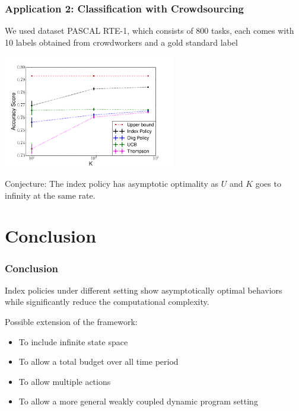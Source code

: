 \documentclass{beamer}
\begin{document}
\begin{frame}[plain]
\frametitle{Application 2: Classification with Crowdsourcing}
We used dataset PASCAL RTE-1\cite{Snow2008}, which consists of 800 tasks, each comes with 10 labels obtained from crowdworkers and a gold standard label\\

\begin{center}
\includegraphics[width=75mm]{plot_real_sim_reward.pdf}
\end{center}

Conjecture: The index policy has asymptotic optimality as $U$ and $K$ goes to infinity at the same rate.
\end{frame}

\section{Conclusion}
\begin{frame}[plain]
\frametitle{Conclusion}
Index policies under different setting show asymptotically optimal behaviors while significantly reduce the computational complexity.

Possible extension of the framework:
\begin{itemize}
\item To include infinite state space
\item To allow a total budget over all time period
\item To allow multiple actions
\item To allow a more general weakly coupled dynamic program setting
\end{itemize}
\end{frame}
\end{document}
